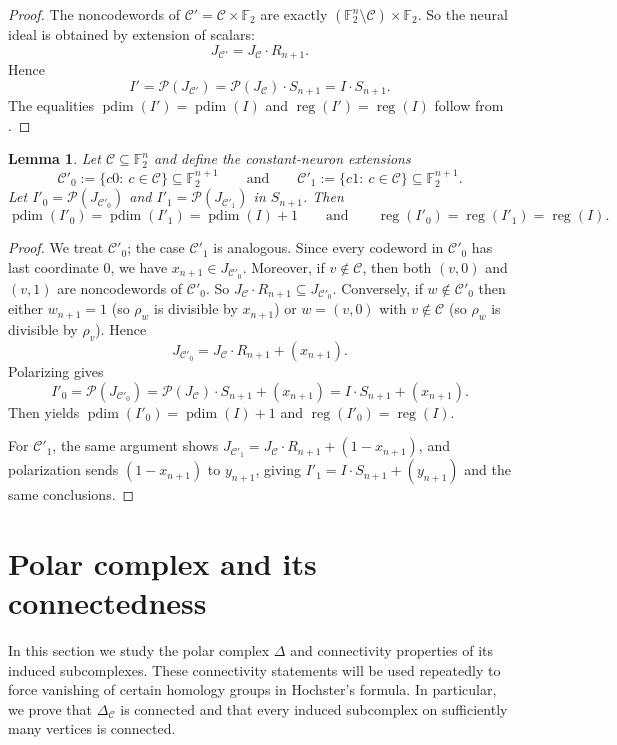 \documentclass[12pt]{amsart}
\newtheorem{lemma}[theorem]{Lemma}
\theoremstyle{remark}
\theoremstyle{definition}
\DeclareMathOperator{\reg}{reg}
\DeclareMathOperator{\pd}{pdim}
\newcommand{\F}{\mathbb{F}}
\newcommand{\C}{\mathcal{C}}
\def\P{{\mathcal P}}
\begin{document}
\begin{proof}
The noncodewords of $\C'=\C\times\F_2$ are exactly $(\F_2^n\setminus\C)\times\F_2$.  So the neural ideal is
obtained by extension of scalars:
\[
J_{\C'}  =  J_\C\cdot R_{n+1}.
\]
Hence
\[
I'=\P(J_{\C'})  =  \P(J_\C)\cdot S_{n+1}  =  I\cdot S_{n+1}.
\]
The equalities $\pd(I')=\pd(I)$ and $\reg(I')=\reg(I)$  follow from
.
\end{proof}

\begin{lemma}\label{lem:constant-neuron}
Let $\C\subseteq\F_2^n$ and define the constant-neuron extensions
\[
\C'_0:=\{c0:\ c\in\C\}\subseteq\F_2^{n+1}
\qquad\text{and}\qquad
\C'_1:=\{c1:\ c\in\C\}\subseteq\F_2^{n+1}.
\]
Let $I'_0=\P(J_{\C'_0})$ and $I'_1=\P(J_{\C'_1})$ in $S_{n+1}$.  Then
\[
\pd(I'_0)=\pd(I'_1)=\pd(I)+1
\qquad\text{and}\qquad
\reg(I'_0)=\reg(I'_1)=\reg(I).
\]
\end{lemma}

\begin{proof}
We treat $\C'_0$; the case $\C'_1$ is analogous.  Since every codeword in $\C'_0$ has last coordinate $0$,
we have $x_{n+1}\in J_{\C'_0}$.  Moreover, if $v\notin\C$, then both $(v,0)$ and $(v,1)$ are
noncodewords of $\C'_0$. So $J_\C\cdot R_{n+1}\subseteq J_{\C'_0}$.  Conversely, if $w\notin\C'_0$ then
either $w_{n+1}=1$ (so $\rho_w$ is divisible by $x_{n+1}$) or $w=(v,0)$ with $v\notin\C$ (so $\rho_w$ is
divisible by $\rho_v$).  Hence
\[
J_{\C'_0}  =  J_\C\cdot R_{n+1} + (x_{n+1}).
\]
Polarizing gives
\[
I'_0  =  \P(J_{\C'_0})
 =  \P(J_\C)\cdot S_{n+1} + (x_{n+1})
 =  I\cdot S_{n+1} + (x_{n+1}).
\]
Then  yields
$\pd(I'_0)=\pd(I)+1$ and $\reg(I'_0)=\reg(I)$.

For $\C'_1$, the same argument shows $J_{\C'_1}=J_\C\cdot R_{n+1}+(1-x_{n+1})$, and polarization sends
$(1-x_{n+1})$ to $y_{n+1}$, giving $I'_1=I\cdot S_{n+1}+(y_{n+1})$ and the same conclusions.
\end{proof}




\section{Polar complex and its connectedness}\label{subsec:polar-connectedness}

In this section we study the polar complex $\Delta$ and connectivity properties of its induced subcomplexes. These connectivity statements will be used repeatedly to force vanishing of certain homology groups in Hochster’s formula. In particular, we prove that $\Delta_\C$ is connected and that every induced subcomplex on sufficiently many vertices is connected.
\end{document}
